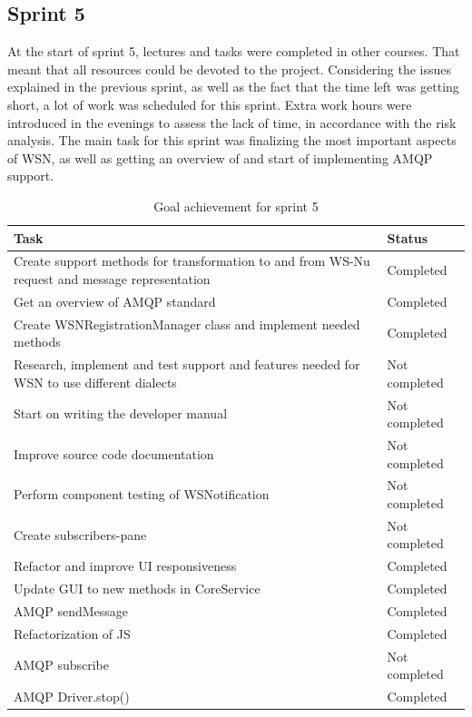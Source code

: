 \subsection{Sprint 5}
\label{subsec:project_lifecycle-development-sprint_5}
At the start of sprint 5, lectures and tasks were completed in other courses. That meant that all resources could be devoted to the project. Considering the issues explained in the previous sprint, as well as the fact that the time left was getting short, a lot of work was scheduled for this sprint. Extra work hours were introduced in the evenings to assess the lack of time, in accordance with the risk analysis. The main task for this sprint was finalizing the most important aspects of WSN, as well as getting an overview of and start of implementing AMQP support.

\begin{table}[ht!]
\small
\centering
\begin{tabular}{ | p{10cm} | p{2cm} |}
\hline
 \rowcolor{lightgray}
 \textbf{Task} & \textbf{Status} \\
\hline
\rowcolor{green!30}
Create support methods for transformation to and from WS-Nu request and message representation & Completed \\
\rowcolor{green!30}
Get an overview of AMQP standard & Completed \\
\rowcolor{green!30}
Create WSNRegistrationManager class and implement needed methods & Completed \\
\rowcolor{orange!40}
Research, implement and test support and features needed for WSN to use different dialects	& Not completed \\
\rowcolor{orange!40}
Start on writing the developer manual & Not completed \\
\rowcolor{orange!40}
Improve source code documentation & Not completed \\
\rowcolor{orange!40}
Perform component testing of WSNotification	& Not completed \\
\rowcolor{orange!40}
Create subscribers-pane	& Not completed \\
\rowcolor{green!30}
Refactor and improve UI responsiveness & Completed \\
\rowcolor{green!30}
Update GUI to new methods in CoreService & Completed \\
\rowcolor{green!30}
AMQP sendMessage & Completed \\
\rowcolor{green!30}
Refactorization of JS & Completed \\
\rowcolor{orange!40}
AMQP subscribe & Not completed \\
\rowcolor{green!30}
AMQP Driver.stop() & Completed \\
\hline
\end{tabular}
\caption{Goal achievement for sprint 5}
\label{tab:sprint 5, goals}
\end{table}

